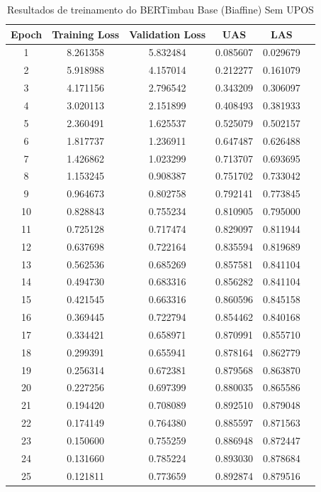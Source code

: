 \begin{table}[ht]
\centering
\caption{Resultados de treinamento do BERTimbau Base (Biaffine) Sem UPOS}
\label{tab:bertimbau-large-biaffine_sem_upos}
\begin{tabular}{c c c c c c}
\hline
\textbf{Epoch} & \textbf{Training Loss} & \textbf{Validation Loss} & \textbf{UAS} & \textbf{LAS}\\
\hline
1 & 8.261358 & 5.832484 & 0.085607 & 0.029679 \\
2 & 5.918988 & 4.157014 & 0.212277 & 0.161079 \\
3 & 4.171156 & 2.796542 & 0.343209 & 0.306097 \\
4 & 3.020113 & 2.151899 & 0.408493 & 0.381933 \\
5 & 2.360491 & 1.625537 & 0.525079 & 0.502157 \\
6 & 1.817737 & 1.236911 & 0.647487 & 0.626488 \\
7 & 1.426862 & 1.023299 & 0.713707 & 0.693695 \\
8 & 1.153245 & 0.908387 & 0.751702 & 0.733042 \\
9 & 0.964673 & 0.802758 & 0.792141 & 0.773845 \\
10 & 0.828843 & 0.755234 & 0.810905 & 0.795000 \\
11 & 0.725128 & 0.717474 & 0.829097 & 0.811944 \\
12 & 0.637698 & 0.722164 & 0.835594 & 0.819689 \\
13 & 0.562536 & 0.685269 & 0.857581 & 0.841104 \\
14 & 0.494730 & 0.683316 & 0.856282 & 0.841104 \\
15 & 0.421545 & 0.663316 & 0.860596 & 0.845158 \\
16 & 0.369445 & 0.722794 & 0.854462 & 0.840168 \\
17 & 0.334421 & 0.658971 & 0.870991 & 0.855710 \\
18 & 0.299391 & 0.655941 & 0.878164 & 0.862779 \\
19 & 0.256314 & 0.672381 & 0.879568 & 0.863870 \\
20 & 0.227256 & 0.697399 & 0.880035 & 0.865586 \\
21 & 0.194420 & 0.708089 & 0.892510 & 0.879048 \\
22 & 0.174149 & 0.764380 & 0.885597 & 0.871563 \\
23 & 0.150600 & 0.755259 & 0.886948 & 0.872447 \\
24 & 0.131660 & 0.785224 & 0.893030 & 0.878684 \\
25 & 0.121811 & 0.773659 & 0.892874 & 0.879516 \\

\end{tabular}
\end{table}
